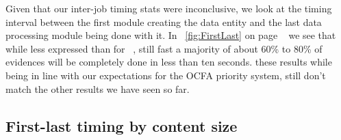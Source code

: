 Given that our inter-job timing stats were inconclusive, we look at the timing interval between the first module creating the data entity and the last data processing module being done with it. In ~\ref{fig:FirstLast} on page ~\pageref{fig:FirstLast} we see that while less expressed than for ~\pageref{fig:Interjob}, still fast a majority of about 60\% to 80\% of evidences will be completely done in less than ten seconds. these results while being in line with our expectations for the OCFA priority system, still don't match the other results we have seen so far.
\subsection{First-last timing by content size}
\begin{figure}
\centering
{}
\hspace{0mm}
\end{figure}
